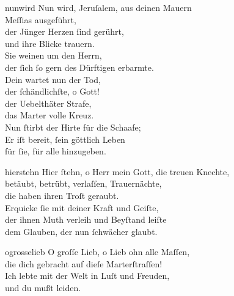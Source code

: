 \documentclass[tocstyle=ref-genre]{ees}
\begin{document}
{  \begin{movement}{nunwird}
    \voice[Basso]
    Nun wird, Jeruſalem, aus deinen Mauern\\
    Meſſias ausgeführt,\\
    der Jünger Herzen ſind gerührt,\\
    und ihre Blicke trauern.\\
    Sie weinen um den Herrn,\\
    der ſich ſo gern des Dürftigen erbarmte.\\
    Dein wartet nun der Tod,\\
    der ſchändlichſte, o Gott!\\
    der Uebelthäter Strafe,\\
    das Marter volle Kreuz.\\
    Nun ſtirbt der Hirte für die Schaafe;\\
    Er iſt bereit, ſein göttlich Leben\\
    für ſie, für alle hinzugeben.
  \end{movement}

  \begin{movement}{hierstehn}
    \voice[Coro]
    Hier ſtehn, o Herr mein Gott, die treuen Knechte,\\
    betäubt, betrübt, verlaſſen, Trauernächte,\\
    die haben ihren Troſt geraubt.\\[1ex]
    Erquicke ſie mit deiner Kraft und Geiſte,\\
    der ihnen Muth verleih und Beyſtand leiſte\\
    dem Glauben, der nun ſchwächer glaubt.
  \end{movement}

  \begin{movement}{ogrosselieb}
    \voice[Coro]
    O groſſe Lieb, o Lieb ohn alle Maſſen,\\
    die dich gebracht auf dieſe Marterſtraſſen!\\
    Ich lebte mit der Welt in Luſt und Freuden,\\
    und du mußt leiden.
  \end{movement}

}
\end{document}
